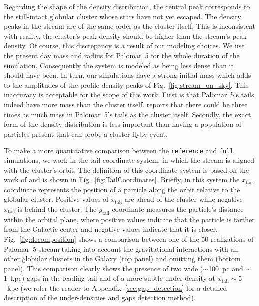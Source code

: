 \documentclass[draft]{aa}
\begin{document}
    Regarding the shape of the density distribution, the central peak corresponds to the still-intact globular cluster whose stars have not yet escaped. The density peaks in the stream are of the same order as the cluster itself. This is inconsistent with reality, the cluster's peak density should be higher than the stream's peak density. Of course, this discrepancy is a result of our modeling choices. We use the present day mass and radius for Palomar~5 for the whole duration of the simulation. Consequently the system is modeled as being less dense than it should have been. In turn, our simulations have a strong initial mass which adds to the amplitudes of the profile density peaks of Fig.~\ref{fig:stream_on_sky}. This inaccuracy is acceptable for the scope of this work. First is that Palomar~5's tails indeed have more mass than the cluster itself. \citet{2017ApJ...842..120I} reports that there could be three times as much mass in Palomar~5's tails as the cluster itself. Secondly, the exact form of the density distribution is less important than having a population of particles present that can probe a cluster flyby event.
    
    To make a more quantitative comparison between the \texttt{reference} and \texttt{full} simulations, we work in the tail coordinate system, in which the stream is aligned with the cluster's orbit. The definition of this coordinate system is based on the work of \citet{2004AJ....127.2753D} and is shown in Fig.~\ref{fig:TailCoordinates}. Briefly, in this system the $x_{\textrm{tail}}$ coordinate represents the position of a particle along the orbit relative to the globular cluster. Positive values of $x_{\textrm{tail}}$ are ahead of the cluster while negative $x_{\textrm{tail}}$ is behind the cluster. The $y_{\textrm{tail}}$ coordinate measures the particle's distance within the orbital plane, where positive values indicate that the particle is farther from the Galactic center and negative values indicate that it is closer. Fig.~\ref{fig:decomposition} shows a comparison between one of the 50 realizations of Palomar~5 stream taking into account the gravitational interactions with all other globular clusters in the Galaxy (top panel) and omitting them (bottom panel). This comparison clearly shows the presence of two wide ($\sim$100~pc and $\sim$1~kpc) gaps in the leading tail and of a more subtle under-density at $x_{\textrm{tail}}\sim 5$~kpc (we refer the reader to Appendix~\ref{sec:gap_detection} for a detailed description of the under-densities and gaps detection method). 
    
\end{document}

